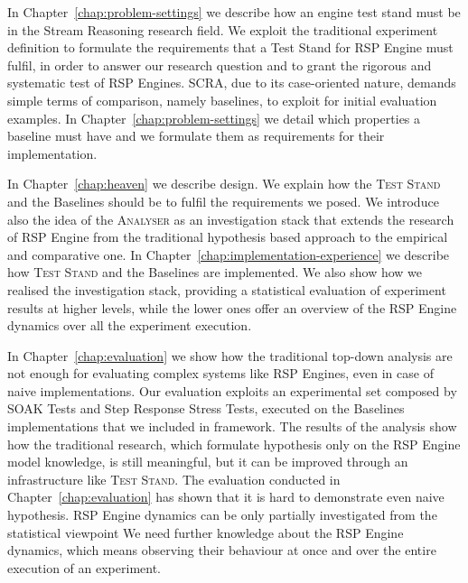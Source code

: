 In Chapter~\ref{chap:problem-settings} we describe how an engine test stand must be in the Stream Reasoning research field. We exploit the traditional experiment definition to formulate the requirements that a Test Stand for RSP Engine must fulfil, in order to answer our research question and to grant the rigorous and systematic test of RSP Engines. SCRA, due to its case-oriented nature, demands simple terms of comparison, namely baselines, to exploit for initial evaluation examples. In Chapter~\ref{chap:problem-settings} we detail which properties a baseline must have and we formulate them as requirements for their implementation.


In Chapter~\ref{chap:heaven} we describe \name design. We explain how the \textsc{Test Stand} and the Baselines should be to fulfil the requirements we posed. We introduce also the idea of the \textsc{Analyser} as an investigation stack that extends the research of RSP Engine from the traditional hypothesis based approach to the empirical and comparative one. In Chapter~\ref{chap:implementation-experience} we describe how \name \textsc{Test Stand} and the Baselines are implemented. We also show how we realised the investigation stack, providing a statistical evaluation of experiment results at higher levels, while the lower ones offer an overview of the RSP Engine dynamics over all the experiment execution.

In Chapter~\ref{chap:evaluation} we show how the traditional top-down analysis are not enough for evaluating complex systems like RSP Engines, even in case of naive implementations. Our evaluation exploits an experimental set composed by SOAK Tests and Step Response Stress Tests, executed on the Baselines implementations that we included in \name framework. The results of the analysis show how the traditional research, which formulate hypothesis only on the RSP Engine model knowledge, is still meaningful, but it can be improved through an infrastructure like \name \textsc{Test Stand}. The evaluation conducted in Chapter~\ref{chap:evaluation} has shown that it is hard to demonstrate even naive hypothesis. RSP Engine dynamics can be only partially investigated from the statistical viewpoint We need further knowledge about the RSP Engine dynamics, which means observing their behaviour at once and over the entire execution of an experiment. %

